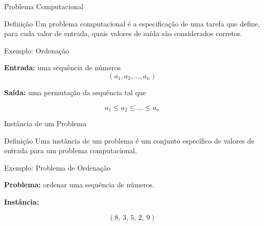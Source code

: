 \documentclass{beamer}
\newcommand{\og}[1]{\textcolor{rsOrange}{#1}}
\begin{document}
\begin{frame}{Problema Computacional}

\begin{block}{Definição}
Um problema computacional é a especificação de uma tarefa que define,
para cada valor de \og{entrada}, quais valores de \og{saída} são considerados corretos.
\end{block}

\vspace{0.4cm}

\begin{exampleblock}{Exemplo: Ordenação}

\textbf{Entrada:} uma sequência de números  
\[
(a_1, a_2, \dots, a_n)
\]

\textbf{Saída:} uma permutação da sequência tal que

\[
a_1 \le a_2 \le \dots \le a_n
\]

\end{exampleblock}

\end{frame}
\begin{frame}{Instância de um Problema}

\begin{block}{Definição}
Uma \og{instância de um problema} é um conjunto específico de valores
de entrada para um problema computacional.
\end{block}

\vspace{0.4cm}

\begin{exampleblock}{Exemplo: Problema de Ordenação}

\textbf{Problema:} ordenar uma sequência de números.

\textbf{Instância:}

\[
(8,\,3,\,5,\,2,\,9)
\]

\end{exampleblock}

\end{frame}
\end{document}
